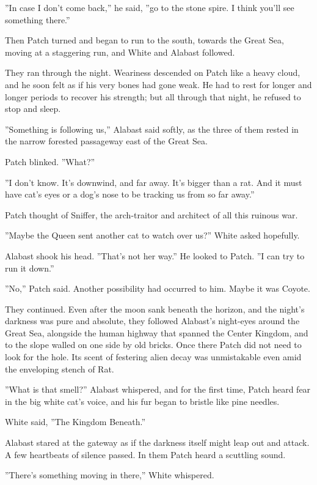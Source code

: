 \documentclass[12pt]{book}
\begin{document}
 ''In case I don't come back,'' he said, ''go to the stone spire. I think you'll see something there.''\par
 Then Patch turned and began to run to the south, towards the Great Sea, moving at a staggering run, and White and Alabast followed.\par
They ran through the night. Weariness descended on Patch like a heavy cloud, and he soon felt as if his very bones had gone weak. He had to rest for longer and longer periods to recover his strength; but all through that night, he refused to stop and sleep.\par
 ''Something is following us,'' Alabast said softly, as the three of them rested in the narrow forested passageway east of the Great Sea.\par
 Patch blinked. ''What?''\par
 ''I don't know. It's downwind, and far away. It's bigger than a rat. And it must have cat's eyes or a dog's nose to be tracking us from so far away.''\par
 Patch thought of Sniffer, the arch-traitor and architect of all this ruinous war.\par
 ''Maybe the Queen sent another cat to watch over us?'' White asked hopefully.\par
 Alabast shook his head. ''That's not her way.'' He looked to Patch. ''I can try to run it down.''\par
 ''No,'' Patch said. Another possibility had occurred to him. Maybe it was Coyote.\par
 They continued. Even after the moon sank beneath the horizon, and the night's darkness was pure and absolute, they followed Alabast's night-eyes around the Great Sea, alongside the human highway that spanned the Center Kingdom, and to the slope walled on one side by old bricks. Once there Patch did not need to look for the hole. Its scent of festering alien decay was unmistakable even amid the enveloping stench of Rat.\par
 ''What is that smell?'' Alabast whispered, and for the first time, Patch heard fear in the big white cat's voice, and his fur began to bristle like pine needles.\par
 White said, ''The Kingdom Beneath.''\par
 Alabast stared at the gateway as if the darkness itself might leap out and attack. A few heartbeats of silence passed. In them Patch heard a scuttling sound.\par
 ''There's something moving in there,'' White whispered.\par
\end{document}
